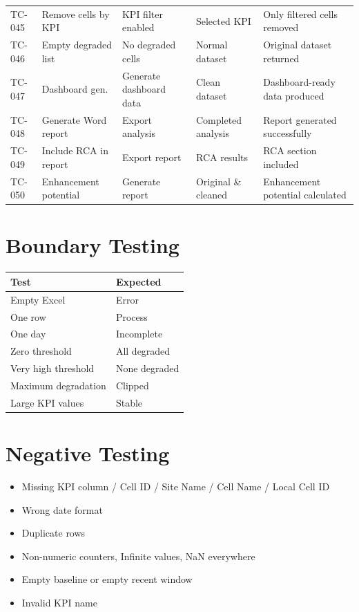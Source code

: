 \begin{center}
\begin{tabularx}{\textwidth}{l X X X X}
TC-045 & Remove cells by KPI & KPI filter enabled & Selected KPI & Only filtered cells removed \\
TC-046 & Empty degraded list & No degraded cells & Normal dataset & Original dataset returned \\
TC-047 & Dashboard gen. & Generate dashboard data & Clean dataset & Dashboard-ready data produced \\
TC-048 & Generate Word report & Export analysis & Completed analysis & Report generated successfully \\
TC-049 & Include RCA in report & Export report & RCA results & RCA section included \\
TC-050 & Enhancement potential & Generate report & Original \& cleaned & Enhancement potential calculated \\
\bottomrule
\end{tabularx}
\end{center}

\section{Boundary Testing}

\begin{table}[h!]
\centering
\begin{tabularx}{0.5\textwidth}{X X}
\toprule
\textbf{Test} & \textbf{Expected} \\
\midrule
Empty Excel & Error \\
One row & Process \\
One day & Incomplete \\
Zero threshold & All degraded \\
Very high threshold & None degraded \\
Maximum degradation & Clipped \\
Large KPI values & Stable \\
\bottomrule
\end{tabularx}
\end{table}

\section{Negative Testing}
\begin{itemize}[leftmargin=*]
    \item Missing KPI column / Cell ID / Site Name / Cell Name / Local Cell ID
    \item Wrong date format
    \item Duplicate rows
    \item Non-numeric counters, Infinite values, NaN everywhere
    \item Empty baseline or empty recent window
    \item Invalid KPI name
\end{itemize}

